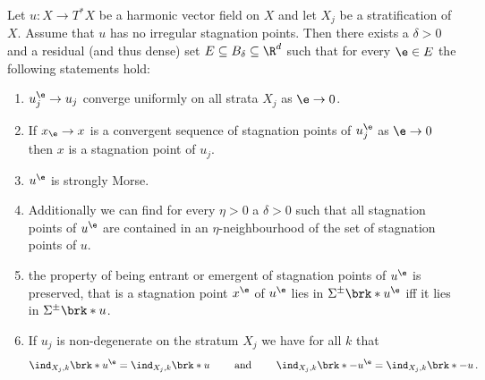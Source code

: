 \begin{corollary}\label{co:density_boundaryGeneric}
  Let $u\colon X\to T^*X$ be a harmonic vector field on $X$ and let $X_j$ be a stratification of $X$.
  Assume that $u$ has no irregular stagnation points.
  Then there exists a $\delta>0$ and a residual (and thus dense) set $E\subseteq B_\delta\subseteq\R^d$ such that for every $\e\in E$
  the following statements hold:
  \begin{enumerate}
    \item $u_j^\e\to u_j$ converge uniformly on all strata $X_j$ as $\e\to0$.\label{co:nonDegeneracy_density_uniform}
    \item If $x_\e\to x$ is a convergent sequence of stagnation points of $u_j^\e$ as $\e\to0$ then
      $x$ is a stagnation point of $u_j$.\label{co:nonDegeneracy_density_limitPoint}
    \item $u^\e$ is strongly Morse. \label{co:nonDegeneracy_density_nonDeg}
    \item Additionally we can find for every $\eta>0$ a $\delta>0$ such that all stagnation points of $u^\e$ are contained in an 
    $\eta$-neighbourhood of the set of stagnation points of $u$.\label{co:nonDegeneracy_density_etaNbh}
    \item the property of being entrant or emergent of stagnation points of $u^\e$ is preserved, that is 
      a stagnation point $x^\e$ of $u^\e$ lies in $\Sigma^\pm\brk*{u^\e}$ iff it lies in $\Sigma^\pm\brk*{u}$.\label{co:nonDegeneracy_density_entrEmerg}
    \item If $u_j$ is non-degenerate on the stratum $X_j$ we have\label{co:nonDegeneracy_density_index}
      for all $k$ that
      \begin{align*}
        \ind_{X_j,k}\brk*{u^\e}=\ind_{X_j,k}\brk*{u}\qquad\text{ and }\qquad\ind_{X_j,k}\brk*{-u^\e}=\ind_{X_j,k}\brk*{-u}\,.
      \end{align*}
  \end{enumerate}
\end{corollary}
